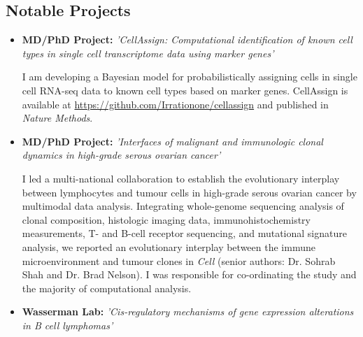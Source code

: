 \documentclass[11pt,a4paper,sans]{moderncv}        %
\begin{document}
\vspace{2pt}

\subsection{Notable Projects}

\vspace{5pt}

\begin{itemize}

\item{\textbf{MD/PhD Project:} \textit{'CellAssign: Computational identification of known cell types in single cell transcriptome data using marker genes'}

\vspace{3pt}

\small{I am developing a Bayesian model for probabilistically assigning cells in single cell RNA-seq data to known cell types based on marker genes. CellAssign is available at \url{https://github.com/Irrationone/cellassign}} and published in \emph{Nature Methods}.}

\vspace{6pt}

\item{\textbf{MD/PhD Project:} \textit{'Interfaces of malignant and immunologic clonal dynamics in high-grade serous ovarian cancer'}

\vspace{3pt}

\small{I led a multi-national collaboration to establish the evolutionary interplay between lymphocytes and tumour cells in high-grade serous ovarian cancer by multimodal data analysis. Integrating whole-genome sequencing analysis of clonal composition, histologic imaging data, immunohistochemistry measurements, T- and B-cell receptor sequencing, and mutational signature analysis, we reported an evolutionary interplay between the immune microenvironment and tumour clones in \emph{Cell} (senior authors: Dr. Sohrab Shah and Dr. Brad Nelson). I was responsible for co-ordinating the study and the majority of computational analysis.}}

\vspace{6pt}

\item{\textbf{Wasserman Lab:} \textit{'Cis-regulatory mechanisms of gene expression alterations in B cell lymphomas'}

\vspace{3pt}

}
\end{itemize}
\end{document}
